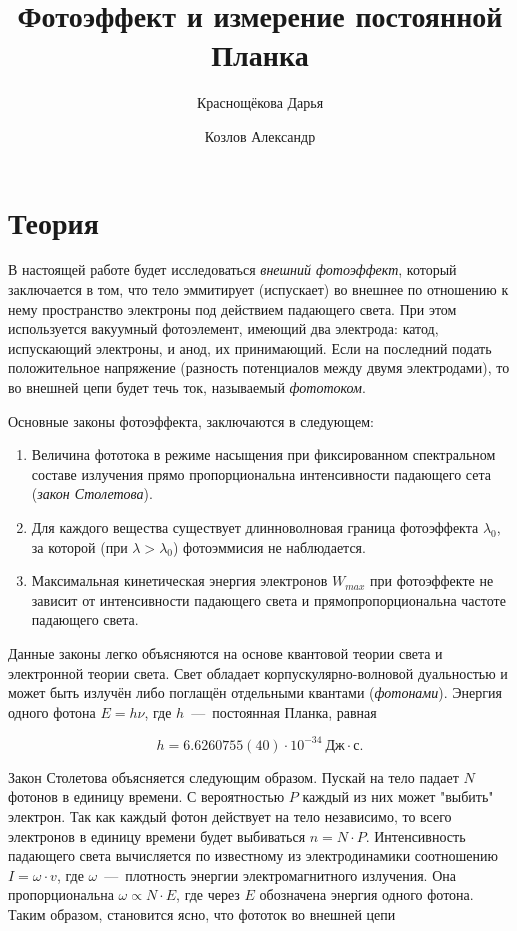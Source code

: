 \documentclass[12pt]{article}
\title{Фотоэффект и измерение постоянной Планка}
\author{Краснощёкова Дарья \and Козлов Александр}
\begin{document}
	

	\tableofcontents
	\newpage

	\section{Теория} %
	\label{sec:theory}
	В настоящей работе будет исследоваться \emph{внешний фотоэффект}, который заключается в том, что тело эммитирует (испускает) во внешнее по отношению к нему пространство электроны под действием падающего света. При этом используется вакуумный фотоэлемент, имеющий два электрода: катод, испускающий электроны, и анод, их принимающий. Если на последний подать положительное напряжение (разность потенциалов между двумя электродами), то во внешней цепи будет течь ток, называемый \emph{фототоком}.

	\par Основные законы фотоэффекта, заключаются в следующем:
	\begin{enumerate}
		\item Величина фототока в режиме насыщения при фиксированном спектральном составе излучения прямо пропорциональна интенсивности падающего сета (\emph{закон Столетова}).

		\item Для каждого вещества существует длинноволновая граница фотоэффекта $\lambda_0$, за которой (при $\lambda > \lambda_0$) фотоэммисия не наблюдается.

		\item Максимальная кинетическая энергия электронов $W_{max}$ при фотоэффекте не зависит от интенсивности падающего света и прямопропорциональна частоте падающего света.
	\end{enumerate}

	Данные законы легко объясняются на основе квантовой теории света и электронной теории света. Свет обладает корпускулярно\--волновой дуальностью и может быть излучён либо поглащён отдельными квантами (\emph{фотонами}). Энергия одного фотона 
	$E = h \nu$, где $h$~\----~постоянная Планка, равная 

	\[
	h = 6.6260755(40)\cdot 10^{-34}\ \text{Дж}\cdot\text{с}.
	\]

	\par Закон Столетова объясняется следующим образом. Пускай на тело падает $N$ фотонов в единицу времени. С вероятностью $P$ каждый из них может "{}выбить"{} электрон. Так как каждый фотон действует на тело независимо, то всего электронов в единицу времени будет выбиваться $n = N\cdot P$. Интенсивность падающего света вычисляется по известному из электродинамики соотношению $I = \omega\cdot v$, где $\omega$~\----~плотность энергии электромагнитного излучения. Она пропорциональна 
	$\omega \propto N \cdot E$, где через $E$ обозначена энергия одного фотона. Таким образом, становится ясно, что фототок во внешней цепи 
\end{document}
